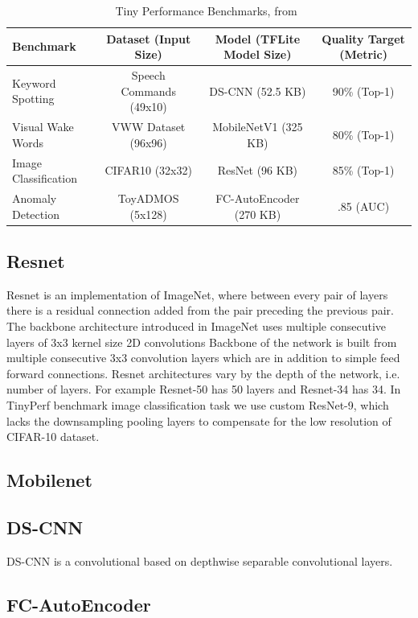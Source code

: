 \documentclass[12pt,a4paper,english
]{tunithesis}
\begin{document}
\begin{table}[ht]
\centering
\caption{Tiny Performance Benchmarks, from~\parencite{tinyperf}}
\begin{adjustbox}{max width=\textwidth}
\begin{tabular}{lccc}
    \toprule
    \textbf{Benchmark} & \textbf{Dataset (Input Size)} & \textbf{Model (TFLite Model Size)} & \textbf{Quality Target (Metric)} \\
    \midrule
    Keyword Spotting & Speech Commands (49x10) & DS-CNN (52.5 KB) & 90\% (Top-1) \\
    Visual Wake Words & VWW Dataset (96x96)  & MobileNetV1 (325 KB) & 80\% (Top-1) \\
    Image Classification & CIFAR10 (32x32) & ResNet (96 KB) & 85\% (Top-1) \\
    Anomaly Detection & ToyADMOS (5x128)  & FC-AutoEncoder (270 KB) & .85 (AUC) \\
    \bottomrule
\end{tabular}
\end{adjustbox}
\label{tab:tinyperf}
\end{table}

\subsection{Resnet}
Resnet is an implementation of ImageNet, where between every pair of layers there is a residual connection added from the pair preceding the previous pair.
The backbone architecture introduced in ImageNet uses multiple consecutive layers of 3x3 kernel size 2D convolutions
Backbone of the network is built from multiple consecutive 3x3 convolution layers which are in addition to simple feed forward connections.
Resnet architectures vary by the depth of the network, i.e. number of layers. For example Resnet-50 has 50 layers and Resnet-34 has 34. In TinyPerf benchmark image classification task we use custom ResNet-9, which lacks the downsampling pooling layers to compensate for the low resolution of CIFAR-10 dataset.

\subsection{Mobilenet}
\subsection{DS-CNN}
DS-CNN is a convolutional based on depthwise separable convolutional layers.~\
\subsection{FC-AutoEncoder}
\end{document}

